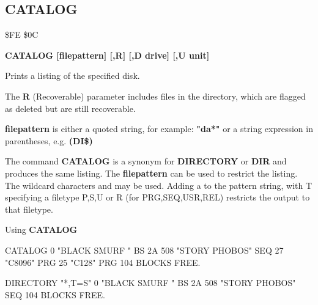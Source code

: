 \subsection{CATALOG}
\begin{description}[leftmargin=3cm,style=nextline]
\item [Token:] \$FE \$0C
\item [Format:] {\bf CATALOG [filepattern] [,R] [,D drive] [,U unit] }
\item [Usage:]
   Prints a listing
   of the specified disk.

   The {\bf R} (Recoverable) parameter includes files in the
   directory, which are flagged as deleted but are still
   recoverable.

   {\bf filepattern} is either a quoted string, for example: {\bf "da*"} or
   a string expression in parentheses, e.g. {\bf (DI\$)}

   \drivedefinition

   \unitdefinition

\item [Remarks:]
   The command {\bf CATALOG} is a synonym for {\bf DIRECTORY}
   or {\bf DIR} and produces the same listing.
   The {\bf filepattern} can be used to restrict the listing.
   The wildcard characters \screentext{*} and  may be used.
   Adding a  to the pattern string, with T specifying
   a filetype P,S,U or R (for PRG,SEQ,USR,REL) restricts the
   output to that filetype.

\item [Example:] Using {\bf CATALOG}
\begin{screenoutput}
CATALOG
  0 "BLACK SMURF     " BS  2A
508 "STORY PHOBOS"         SEQ
27  "C8096"                PRG
25  "C128"                 PRG
104 BLOCKS FREE.

DIRECTORY "*,T=S"
  0 "BLACK SMURF     " BS  2A
508 "STORY PHOBOS"         SEQ
104 BLOCKS FREE.
\end{screenoutput}
\end{description}


\newpage
